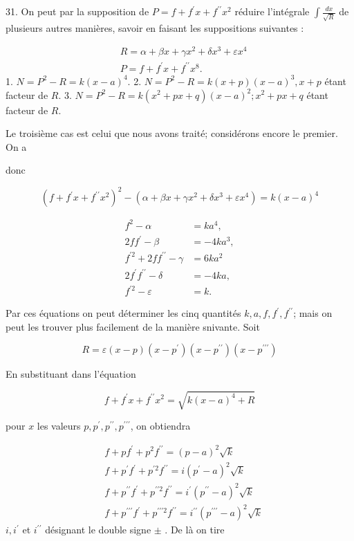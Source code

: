 \documentclass{article}
\begin{document}
31. On peut par la supposition de \(P=f+f^{\prime} x+f^{\prime \prime} x^{2}\) réduire l'intégrale \(\int \frac{d x}{\sqrt{R}}\) de plusieurs autres manières, savoir en faisant les suppositions suivantes :

\[
\begin{aligned}
& R=\alpha+\beta x+\gamma x^{2}+\delta x^{3}+\varepsilon x^{4} \\
& P=f+f^{\prime} x+f^{\prime \prime} x^{8} .
\end{aligned}
\]
1. \(N=P^{2}-R=k(x-a)^{4}\).
2. \(N=P^{2}-R=k(x+p)(x-a)^{3}, x+p\) étant facteur de \(R\).
3. \(N=P^{2}-R=k\left(x^{2}+p x+q\right)(x-a)^{2} ; x^{2}+p x+q\) étant facteur de \(R\).

Le troisième cas est celui que nous avons traité; considérons encore le premier. On a

donc

\[
\left(f+f^{\prime} x+f^{\prime \prime} x^{2}\right)^{2}-\left(\alpha+\beta x+\gamma x^{2}+\delta x^{3}+\varepsilon x^{4}\right)=k(x-a)^{4}
\]

\[
\begin{aligned}
f^{2}-\alpha & =k a^{4}, \\
2 f f^{\prime}-\beta & =-4 k a^{3}, \\
f^{\prime 2}+2 f f^{\prime \prime}-\gamma & =6 k a^{2} \\
2 f^{\prime} f^{\prime \prime}-\delta & =-4 k a, \\
f^{\prime 2}-\varepsilon & =k .
\end{aligned}
\]

Par ces équations on peut déterminer les cinq quantités \(k, a, f, f^{\prime}, f^{\prime \prime}\); mais on peut les trouver plus facilement de la manière snivante. Soit

\[
R=\varepsilon(x-p)\left(x-p^{\prime}\right)\left(x-p^{\prime \prime}\right)\left(x-p^{\prime \prime \prime}\right)
\]

En substituant dans l'équation

\[
f+f^{\prime} x+f^{\prime \prime} x^{2}=\sqrt{k(x-a)^{4}+R}
\]

pour \(x\) les valeurs \(p, p^{\prime}, p^{\prime \prime}, p^{\prime \prime \prime}\), on obtiendra

\[
\begin{aligned}
& f+p f^{\prime}+p^{2} f^{\prime \prime}=(p-a)^{2} \sqrt{k} \\
& f+p^{\prime} f^{\prime}+p^{\prime 2} f^{\prime \prime}=i\left(p^{\prime}-a\right)^{2} \sqrt{k} \\
& f+p^{\prime \prime} f^{\prime}+p^{\prime \prime 2} f^{\prime \prime}=i^{\prime}\left(p^{\prime \prime}-a\right)^{2} \sqrt{k} \\
& f+p^{\prime \prime \prime} f^{\prime}+p^{\prime \prime \prime 2} f^{\prime \prime}=i^{\prime \prime}\left(p^{\prime \prime \prime}-a\right)^{2} \sqrt{k}
\end{aligned}
\]
\(i, i^{\prime}\) et \(i^{\prime \prime}\) désignant le double signe \(\pm\) . De là on tire
\end{document}
